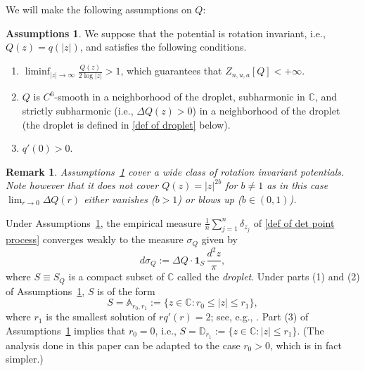 \documentclass[reqno]{amsart}
\newcommand{\1}{\mathds{1}}
\newcommand{\C}{\mathds{C}}
\numberwithin{equation}{section}
\newtheorem{remark}[theorem]{Remark}
\theoremstyle{definition}
\newtheorem{assumption}[definition]{Assumptions}
\begin{document}
We will make the following assumptions on $Q$:
\begin{assumption}\label{Assumption_Q}
We suppose that the potential is rotation invariant, i.e., $Q(z)=q(|z|)$, and  satisfies the following conditions. 
\begin{enumerate}
\item[\textup{(1)}]\label{Assumption 1}
$\liminf_{|z|\to\infty}\frac{Q(z)}{2\log|z|}>1$, which guarantees that $Z_{n,u,a}[Q]<+\infty$. 
\item[\textup{(2)}] \label{Assumption 2}
$Q$ is $C^{6}$-smooth in a neighborhood of the droplet, subharmonic in $\C$, and strictly subharmonic (i.e., $\Delta Q(z)>0$) in a neighborhood of the droplet (the droplet is defined in \eqref{def of droplet} below).
\item[\textup{(3)}] $q'(0)>0$. 
\end{enumerate}
\end{assumption}
\begin{remark}
\label{remark:MF Potential}
Assumptions~\ref{Assumption_Q} cover a wide class of rotation invariant potentials.
Note however that it does not cover $Q(z)=|z|^{2b}$ for $b\neq 1$ as in this case $\lim_{r\to0}\Delta Q(r)$ either vanishes \textup{(}$b>1$\textup{)} or blows up \textup{(}$b\in(0,1)$\textup{)}.
\end{remark}
Under Assumptions~\ref{Assumption_Q}, the empirical measure $\frac1n\sum_{j=1}^n\delta_{z_j}$ of \eqref{def of det point process} converges weakly to the measure $\sigma_Q$ given by 
\begin{equation}
\label{def of sigma Q}
d\sigma_Q := \Delta Q \cdot \mathbf{1}_{S}\,\frac{d^2z}{\pi},
\end{equation}
where $S \equiv S_{Q}$ is a compact subset of $\C$ called the {\it droplet}.
Under parts (1) and (2) of Assumptions~\ref{Assumption_Q}, $S$ is of the form 
\begin{equation}
\label{def of droplet}
S = \mathbb{A}_{r_0,r_1}:=\{z \in \C : r_0 \leq |z| \leq r_1\},
\end{equation}
where $r_1$ is the smallest solution of $r q'(r)=2$; see, e.g., \cite{BKS2023,SaTo}. 
Part (3) of Assumptions~\ref{Assumption_Q} implies that $r_0=0$, i.e., $S=\mathbb{D}_{r_1}:=\{z\in\C:|z|\leq r_1\}$. (The analysis done in this paper can be adapted to the case $r_0>0$, which is in fact simpler.) 
\end{document}
